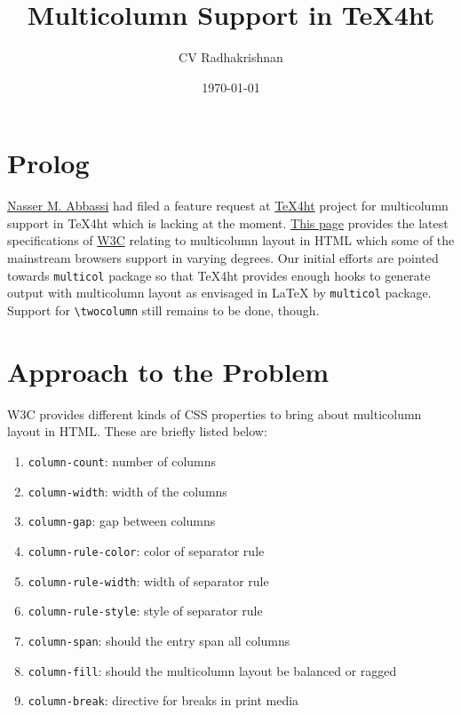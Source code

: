\documentclass{article}
\author{CV Radhakrishnan}
\date{\today}
\title{Multicolumn Support in TeX4ht}
\begin{document}
\maketitle
\tableofcontents



\section*{Prolog}
\label{sec-1}

\href{http://www.12000.org/}{Nasser M. Abbassi} had filed a feature request at \href{http://puszcza.gnu.org.ua/bugs/?188}{TeX4ht} project for
multicolumn support in TeX4ht which is lacking at the moment. \href{http://www.w3.org/TR/css3-multicol/}{This
page} provides the latest specifications of \href{http://www.w3.org}{W3C} relating to multicolumn
layout in HTML which some of the mainstream browsers support in
varying degrees.  Our initial efforts are pointed towards \texttt{multicol}
package so that TeX4ht provides enough hooks to generate output with
multicolumn layout as envisaged in \LaTeX{} by \texttt{multicol} package.
Support for \texttt{\textbackslash{}twocolumn} still remains to be done, though.

\section*{Approach to the Problem}
\label{sec-2}

W3C provides different kinds of CSS properties to bring about
multicolumn layout in HTML. These are briefly listed below:

\begin{enumerate}
\item \texttt{column-count}: number of columns
\item \texttt{column-width}: width of the columns
\item \texttt{column-gap}: gap between columns
\item \texttt{column-rule-color}: color of separator rule
\item \texttt{column-rule-width}: width of separator rule
\item \texttt{column-rule-style}: style of separator rule
\item \texttt{column-span}: should the entry span all columns
\item \texttt{column-fill}: should the multicolumn layout be balanced or ragged
\item \texttt{column-break}: directive for breaks in print media
\end{enumerate}
\end{document}
